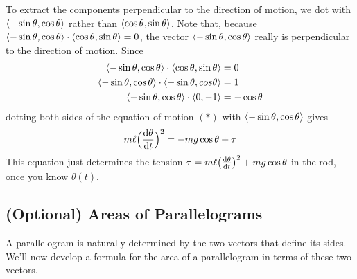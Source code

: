 To extract the components perpendicular to the direction of motion, we
dot with $\left< -\sin\theta,\cos\theta\right> $ rather than $\left< \cos\theta,\sin\theta\right> $. Note that,
because $\left< -\sin\theta,\cos\theta\right> \cdot
   \left< \cos\theta,\sin\theta\right> =0$, the vector
$\left< -\sin\theta,\cos\theta\right> $ really is perpendicular to the 
direction of motion.  Since
\begin{align*}
\left< -\sin\theta,\cos\theta\right> \cdot\left< \cos\theta,\sin\theta\right> &=0\\
\left< -\sin\theta,\cos\theta\right> \cdot\left< -\sin\theta,cos\theta\right> &=1\\
\left< -\sin\theta,\cos\theta\right> \cdot\left< 0,-1\right> &=-\cos\theta
\end{align*}
dotting both sides of the equation of motion $(*)$
with $\left< -\sin\theta,\cos\theta\right> $ gives
\begin{align*}
m\ell\Big(\diff{\theta}{t}\Big)^2=-mg\cos\theta+\tau 
\end{align*}
This equation just determines the tension
$\tau=m\ell\big(\diff{\theta}{t}\big)^2+mg\cos\theta$ in the rod, once you know
$\theta(t)$.

\subsection{(Optional) Areas of Parallelograms}\label{sec:GEOparallelogram}
A parallelogram is naturally determined by the two vectors that 
define its sides. We'll now develop a formula for the area of a
parallelogram in terms of these two vectors. 

